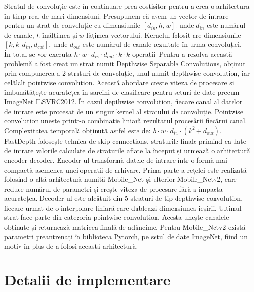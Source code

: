 \documentclass[12pt,a4paper]{report}
\begin{document}
Stratul de convoluție este în continuare prea costisitor pentru a crea o arhitectura în timp
real de mari dimensiuni. Presupunem că avem un vector de intrare pentru un strat de convoluție
cu dimensiunile \([d_{in}, h, w]\), unde \(d_{in}\) este numărul de canale,  \(h \) înălțimea și \(w\) lățimea vectorului.
Kernelul folosit are dimensiunile \([k, k, d_{in}, d_{out}]\),
unde \(d_{out}\) este numărul de canale rezultate în urma convoluției.
În total se vor executa $ h \cdot w \cdot d_{in} \cdot d_{out} \cdot k \cdot k$ operații.
Pentru  a rezolva această problemă a fost creat un strat numit Depthwise Separable Convolutions\cite{sifre2014rigidmotionscatteringtextureclassification}, 
obținut prin compunerea a 2 straturi de convoluție, unul numit depthwise convolution,
iar celălalt pointwise convolution. Această abordare crește viteza de procesare și îmbunătățește
acuratețea în sarcini de clasificare pentru seturi de date precum ImageNet ILSVRC2012. În cazul 
depthwise convolution, fiecare canal al datelor de intrare este procesat de un singur kernel
al stratului de convoluție. Pointwise convolution unește printr-o combinație liniară
rezultatul procesării fiecărui canal. Complexitatea temporală obținută astfel este de:
$ h \cdot w \cdot d_{in} \cdot (k^2 + d_{out})$\cite{fast}. \\ 

FastDepth folosește tehnica de skip connections, straturile finale primind ca date de intrare
valorile calculate de straturile aflate la început și urmează o arhitectură encoder-decoder. 
Encoder-ul transformă datele de intrare într-o formă mai compactă asemenea unei operații de arhivare.
Prima parte a rețelei este realizată folosind o altă arhitectură numită Mobile\_Net\cite{howard2017mobilenetsefficientconvolutionalneural} și 
ulterior Mobile\_Netv2\cite{sandler2019mobilenetv2invertedresidualslinear}, 
care reduce numărul de parametri și crește viteza de procesare fără a impacta acuratețea. 
Decoder-ul este alcătuit din 5 straturi de tip depthwise convolution, fiecare urmat de o 
interpolare liniară care dublează dimensiunea ieșirii. Ultimul strat face parte din categoria 
pointwise convolution. Acesta unește canalele obținute și returnează matricea finală de adâncime. Pentru
Mobile\_Netv2 există parametri preantrenați în biblioteca Pytorch\cite{paszke2017automatic}, pe setul de date ImageNet,
fiind un motiv în plus de a folosi această arhitectură.

\chapter{Detalii de implementare}
\end{document}
